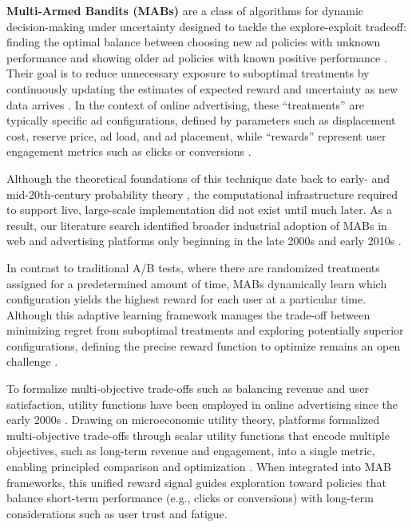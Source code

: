 \documentclass[manuscript,review,screen]{acmart}
\begin{document}
\textbf{Multi-Armed Bandits (MABs)} are a class of algorithms for dynamic decision-making under uncertainty designed to tackle the explore-exploit tradeoff: finding the optimal balance between choosing new ad policies with unknown performance and showing older ad policies with known positive performance \cite{schwartz2017customer, burtini2015improving}. Their goal is to reduce unnecessary exposure to suboptimal treatments by continuously updating the estimates of expected reward and uncertainty as new data arrives \cite{kuleshov2014algorithms}. In the context of online advertising, these ``treatments'' are typically specific ad configurations, defined by parameters such as displacement cost, reserve price, ad load, and ad placement, while ``rewards'' represent user engagement metrics such as clicks or conversions \cite{schwartz2017customer}.

Although the theoretical foundations of this technique date back to early- and mid-20th-century probability theory \cite{robbins1952sequential}, the computational infrastructure required to support live, large-scale implementation did not exist until much later. As a result, our literature search identified broader industrial adoption of MABs in web and advertising platforms only beginning in the late 2000s and early 2010s \cite{li2010contextual, chapelle2011empirical, schwartz2017customer}.

In contrast to traditional A/B tests, where there are randomized treatments assigned for a predetermined amount of time, MABs dynamically learn which configuration yields the highest reward for each user at a particular time. Although this adaptive learning framework manages the trade-off between minimizing regret from suboptimal treatments and exploring potentially superior configurations, defining the precise reward function to optimize remains an open challenge  \cite{wen2019learning}.

To formalize multi-objective trade-offs such as balancing revenue and user satisfaction, utility functions have been employed in online advertising since the early 2000s \cite{engel2008incorporating}. Drawing on microeconomic utility theory, platforms formalized multi-objective trade-offs through scalar utility functions that encode multiple objectives, such as long-term revenue and engagement, into a single metric, enabling principled comparison and optimization \cite{engel2008incorporating}. When integrated into MAB frameworks, this unified reward signal guides exploration toward policies that balance short-term performance (e.g., clicks or conversions) with long-term considerations such as user trust and fatigue. 
\end{document}
